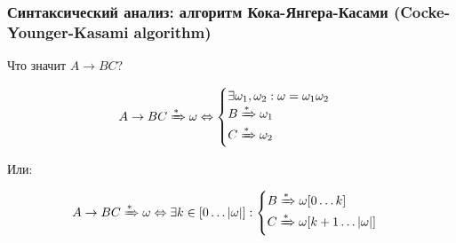 \documentclass{beamer}
\newcommand{\derives}[1][*]{\xRightarrow[]{#1}}
\begin{document}
\begin{frame}[fragile]
  \transwipe[direction=90]
  \frametitle{Синтаксический анализ: алгоритм Кока-Янгера-Касами (Cocke-Younger-Kasami algorithm)}
  
  \begin{center}
    Что значит $A \to BC$?
  \end{center} \pause
  
  \[
    A \to BC  \derives \omega \Leftrightarrow 
              \begin{cases}
                \exists \omega_1, \omega_2: \omega = \omega_1 \omega_2\\
                B \derives \omega_1\\
                C \derives \omega_2
              \end{cases}
  \] \pause

  
  \begin{center}
    Или:
  \end{center}

  \[
    A \to BC  \derives \omega \Leftrightarrow \exists k \in [0 \dots |\omega|]:
              \begin{cases}
                B \derives \omega[0 \dots k]\\
                C \derives \omega[k+1 \dots |\omega|]
              \end{cases}
  \]

\end{frame}
\end{document}
